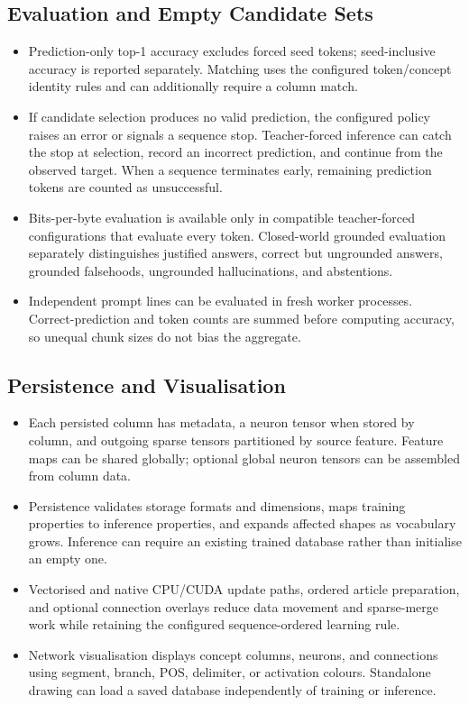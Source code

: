 \subsection{Evaluation and Empty Candidate Sets}
\begin{itemize}
	\item Prediction-only top-1 accuracy excludes forced seed tokens; seed-inclusive accuracy is reported separately. Matching uses the configured token/concept identity rules and can additionally require a column match.
	\item If candidate selection produces no valid prediction, the configured policy raises an error or signals a sequence stop. Teacher-forced inference can catch the stop at selection, record an incorrect prediction, and continue from the observed target. When a sequence terminates early, remaining prediction tokens are counted as unsuccessful.
	\item Bits-per-byte evaluation is available only in compatible teacher-forced configurations that evaluate every token. Closed-world grounded evaluation separately distinguishes justified answers, correct but ungrounded answers, grounded falsehoods, ungrounded hallucinations, and abstentions.
	\item Independent prompt lines can be evaluated in fresh worker processes. Correct-prediction and token counts are summed before computing accuracy, so unequal chunk sizes do not bias the aggregate.
\end{itemize}

\subsection{Persistence and Visualisation}
\begin{itemize}
	\item Each persisted column has metadata, a neuron tensor when stored by column, and outgoing sparse tensors partitioned by source feature. Feature maps can be shared globally; optional global neuron tensors can be assembled from column data.
	\item Persistence validates storage formats and dimensions, maps training properties to inference properties, and expands affected shapes as vocabulary grows. Inference can require an existing trained database rather than initialise an empty one.
	\item Vectorised and native CPU/CUDA update paths, ordered article preparation, and optional connection overlays reduce data movement and sparse-merge work while retaining the configured sequence-ordered learning rule.
	\item Network visualisation displays concept columns, neurons, and connections using segment, branch, POS, delimiter, or activation colours. Standalone drawing can load a saved database independently of training or inference.
\end{itemize}

